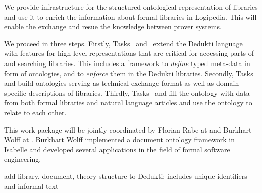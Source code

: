 \begin{workpackage}[id=structuring,wphases=0-48,type=RTD,
  short=Structured Theories and Metadata,%
  title=Structured Theories and Metadata,
  lead=Fau,
  BolRM=6,
  FauRM=36,
  SacRM=36,
  TouRM=12,
  InrRM=12]
  



\begin{wpobjectives}
We provide infrastructure for the structured ontological representation of libraries and use it to enrich the information about formal libraries in Logipedia.
This will enable the exchange and resue the knowledge between prover systems.
\end{wpobjectives}


\begin{wpdescription}
We proceed in three steps.
Firstly, Tasks~ and~ extend the Dedukti language with features for high-level representations that are critical for accessing parts of and searching libraries.
This includes a framework to \emph{define} typed meta-data in form of ontologies, and to \emph{enforce} them in 
the Dedukti libraries.
Secondly, Tasks~ and  build ontologies serving as technical exchange format as well as domain-specific descriptions of libraries.
Thirdly, Tasks~ and  fill the ontology with data from both formal libraries and natural language articles and use the ontology to relate to each other.

This work package will be jointly coordinated by Florian Rabe at  and Burkhart Wolff at .
Burkhart Wolff implemented a document ontology framework in Isabelle and developed several applications
in the field of formal software engineering.
\cite{brucker.ea:ontologies-certification:2019,brucker.ea:isabelle-ontologies:2018,brucker.ea:ontologies-certification:2019} 
\end{wpdescription}

\begin{tasklist}
\begin{task}[id=strlibstructure,title=Library Structure,lead=Fau,FauRM=12]
add library, document, theory structure to Dedukti; includes unique identifiers and informal text


\end{task}
\end{tasklist}
\end{workpackage}
